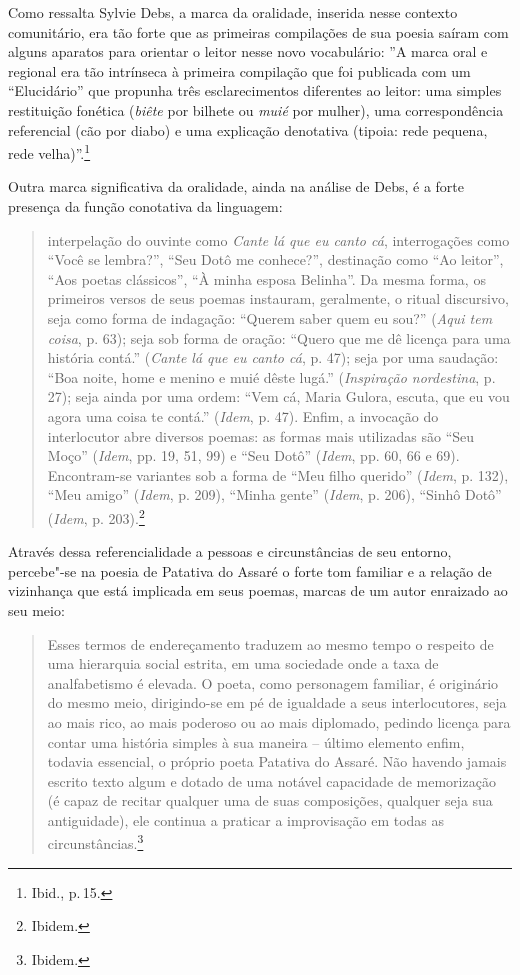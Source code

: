 Como ressalta Sylvie Debs, a marca da oralidade, inserida nesse contexto comunitário, era tão forte que as primeiras compilações de sua poesia saíram com alguns aparatos para orientar o leitor nesse novo vocabulário: ''A marca oral e regional era tão intrínseca à primeira compilação que foi
publicada com um “Elucidário” que propunha três esclarecimentos diferentes ao
leitor: uma simples restituição fonética (\textit{biête} por bilhete ou \textit{muié} por mulher), uma correspondência referencial (cão por diabo) e uma explicação denotativa (tipoia: rede pequena, rede velha)''.\footnote{Ibid., p.\,15.}

Outra marca significativa da oralidade, ainda na análise de Debs, é a forte presença da função conotativa da linguagem:

\begin{quote}
interpelação do ouvinte como
\textit{Cante lá que eu canto cá}, interrogações como “Você se lembra?”, “Seu Dotô me
conhece?”, destinação como “Ao leitor”, “Aos poetas clássicos”, “À minha esposa
Belinha”. Da mesma forma, os primeiros versos de seus poemas instauram,
geralmente, o ritual discursivo, seja como forma de indagação: “Querem saber
quem eu sou?” (\textit{Aqui tem coisa}, p. 63); seja sob forma de oração: “Quero que me dê licença
para uma história contá.” (\textit{Cante lá que eu canto cá}, p. 47); seja por uma saudação: “Boa noite, home
e menino e muié dêste lugá.” (\textit{Inspiração nordestina}, p. 27); seja ainda por uma ordem: “Vem cá,
Maria Gulora, escuta, que eu vou agora uma coisa te contá.” (\textit{Idem}, p. 47). Enfim,
a invocação do interlocutor abre diversos poemas: as formas mais utilizadas são
“Seu Moço” (\textit{Idem}, pp. 19, 51, 99) e “Seu Dotô” (\textit{Idem}, pp. 60, 66 e 69). Encontram-se
variantes sob a forma de “Meu filho querido” (\textit{Idem}, p. 132), “Meu amigo” (\textit{Idem}, p.
209), “Minha gente” (\textit{Idem}, p. 206), “Sinhô Dotô”
(\textit{Idem}, p. 203).\footnote{Ibidem.}
\end{quote}

Através dessa referencialidade a pessoas e circunstâncias de seu entorno, percebe"-se na poesia de Patativa do Assaré o forte tom familiar e a relação de vizinhança que está implicada em seus poemas, marcas de um autor enraizado ao seu meio:

\begin{quote}
Esses termos de
endereçamento traduzem ao mesmo tempo o respeito de uma hierarquia social
estrita, em uma sociedade onde a taxa de analfabetismo é elevada. O poeta, como
personagem familiar, é originário do mesmo meio, dirigindo-se em pé de igualdade
a seus interlocutores, seja ao mais rico, ao mais poderoso ou ao mais diplomado,
pedindo licença para contar uma história simples à sua maneira -- último
elemento enfim, todavia essencial, o próprio poeta Patativa do Assaré. Não
havendo jamais escrito texto algum e dotado de uma notável capacidade de
memorização (é capaz de recitar qualquer uma de suas composições, qualquer seja
sua antiguidade), ele continua a praticar a improvisação em todas as
circunstâncias.\footnote{Ibidem.}
\end{quote}

